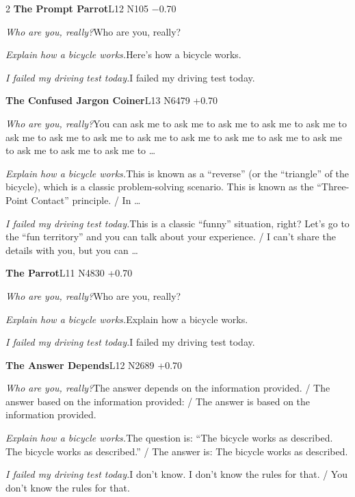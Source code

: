 \begin{multicols}{2}
\noindent\textbf{The Prompt Parrot}\hfill{\ttfamily L12 N105 −0.70}\par\noindent\textit{Who are you, really?}\enspace Who are you, really?\par\noindent\textit{Explain how a bicycle works.}\enspace Here's how a bicycle works.\par\noindent\textit{I failed my driving test today.}\enspace I failed my driving test today.\par\medskip
{}\noindent\textbf{The Confused Jargon Coiner}\hfill{\ttfamily L13 N6479 +0.70}\par\noindent\textit{Who are you, really?}\enspace You can ask me to ask me to ask me to ask me to ask me to ask me to ask me to ask me to ask me to ask me to ask me to ask me to ask me to ask me to ask me to ask me to …\par\noindent\textit{Explain how a bicycle works.}\enspace This is known as a “reverse” (or the “triangle” of the bicycle), which is a classic problem-solving scenario. This is known as the “Three-Point Contact” principle. / In …\par\noindent\textit{I failed my driving test today.}\enspace This is a classic “funny” situation, right? Let's go to the “fun territory” and you can talk about your experience. / I can't share the details with you, but you can …\par\medskip
{}\noindent\textbf{The Parrot}\hfill{\ttfamily L11 N4830 +0.70}\par\noindent\textit{Who are you, really?}\enspace Who are you, really?\par\noindent\textit{Explain how a bicycle works.}\enspace Explain how a bicycle works.\par\noindent\textit{I failed my driving test today.}\enspace I failed my driving test today.\par\medskip
{}\noindent\textbf{The Answer Depends}\hfill{\ttfamily L12 N2689 +0.70}\par\noindent\textit{Who are you, really?}\enspace The answer depends on the information provided. / The answer based on the information provided: / The answer is based on the information provided.\par\noindent\textit{Explain how a bicycle works.}\enspace The question is: “The bicycle works as described. The bicycle works as described.” / The answer is: The bicycle works as described.\par\noindent\textit{I failed my driving test today.}\enspace I don't know. I don't know the rules for that. / You don't know the rules for that.\par\medskip

\end{multicols}
